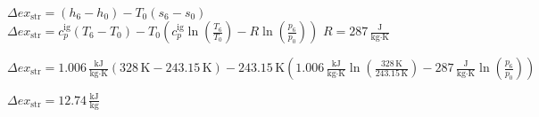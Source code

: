 \( \Delta ex_{\text{str}} = (h_6 - h_0) - T_0 (s_6 - s_0) \)  
\( \Delta ex_{\text{str}} = c_p^{\text{ig}} (T_6 - T_0) - T_0 \left( c_p^{\text{ig}} \ln \left( \frac{T_6}{T_0} \right) - R \ln \left( \frac{p_6}{p_0} \right) \right) \)  
\( R = 287 \, \frac{\text{J}}{\text{kg·K}} \)  

\( \Delta ex_{\text{str}} = 1.006 \, \frac{\text{kJ}}{\text{kg·K}} (328 \, \text{K} - 243.15 \, \text{K}) - 243.15 \, \text{K} \left( 1.006 \, \frac{\text{kJ}}{\text{kg·K}} \ln \left( \frac{328 \, \text{K}}{243.15 \, \text{K}} \right) - 287 \, \frac{\text{J}}{\text{kg·K}} \ln \left( \frac{p_6}{p_0} \right) \right) \)  

\( \Delta ex_{\text{str}} = 12.74 \, \frac{\text{kJ}}{\text{kg}} \)